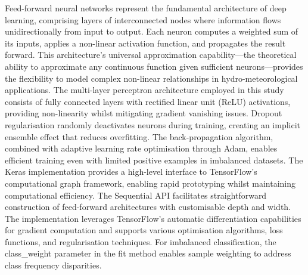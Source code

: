 Feed-forward  neural networks represent the fundamental architecture of deep learning, comprising layers of interconnected nodes where information flows unidirectionally from input to output. Each neuron computes a weighted sum of its inputs, applies a non-linear activation function, and propagates the result forward. This architecture's universal approximation capability—the theoretical ability to approximate any continuous function given sufficient neurons—provides the flexibility to model complex non-linear relationships in hydro-meteorological applications. The multi-layer perceptron architecture employed in this study consists of fully connected layers with rectified linear unit (ReLU) activations, providing non-linearity whilst mitigating gradient vanishing issues. Dropout regularisation randomly deactivates neurons during training, creating an implicit ensemble effect that reduces overfitting. The back-propagation algorithm, combined with adaptive learning rate optimisation through Adam, enables efficient training even with limited positive examples in imbalanced datasets. The Keras implementation provides a high-level interface to TensorFlow's computational graph framework, enabling rapid prototyping whilst maintaining computational efficiency. The Sequential API facilitates straightforward construction of feed-forward architectures with customisable depth and width. The implementation leverages TensorFlow's automatic differentiation capabilities for gradient computation and supports various optimisation algorithms, loss functions, and regularisation techniques. For imbalanced classification, the class\_weight parameter in the fit method enables sample weighting to address class frequency disparities.


